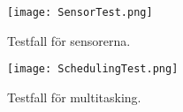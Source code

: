 \begin{figure}[h]
  \texttt{[image: SensorTest.png]}
  \caption{Testfall för sensorerna.}
  \label{fig:SensorTest}
\end{figure}

\begin{figure}[h]
  \texttt{[image: SchedulingTest.png]}
  \caption{Testfall för multitasking.}
  \label{fig:SchedulingTest}
\end{figure}



